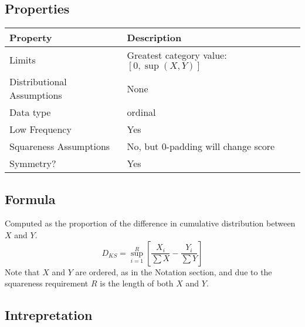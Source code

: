\documentclass[11pt]{article}
\begin{document}
\subsection{Properties}
\begin{tabular}{| l || l |}
    \hline
    {\bf Property} & {\bf Description} \\
    \hline
    Limits & Greatest category value: $[0, \sup(X, Y)]$ \\ \hline

    Distributional Assumptions & None \\ \hline

    Data type & ordinal \\ \hline

    Low Frequency & Yes \\ \hline

    Squareness Assumptions & No, but 0-padding will change score \\ \hline
    
    Symmetry? & Yes \\ \hline

\end{tabular}


\subsection{Formula}
Computed as the proportion of the difference in cumulative distribution between $X$ and $Y$.
$$
D_{KS} = \sup_{i=1}^{R}\left[ \frac{ X_i }{ \sum{X} } - \frac{Y_i}{ \sum{Y} } \right]
$$
Note that $X$ and $Y$ are ordered, as in the Notation section, and due to the squareness requirement $R$ is the length of both $X$ and $Y$.

\subsection{Intrepretation}
\end{document}
